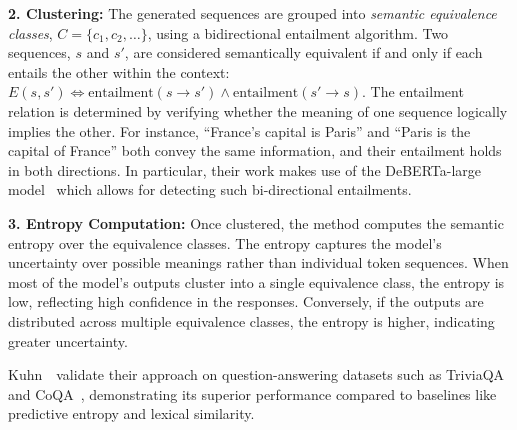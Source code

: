     \noindent\textbf{2. Clustering:} The generated sequences are grouped into \emph{semantic equivalence classes}, $C = \{c_1, c_2, \ldots\}$, using a bidirectional entailment algorithm. 
            Two sequences, $s$ and $s'$, are considered semantically equivalent if and only if each entails the other within the context:
    $E(s, s') \iff \text{entailment}(s \rightarrow s') \land \text{entailment}(s' \rightarrow s)$.
    The entailment relation is determined by verifying whether the meaning of one sequence logically implies the other. 
    For instance, “France's capital is Paris” and “Paris is the capital of France” both convey the same information, and their entailment holds in both directions. 
    In particular, their work makes use of the DeBERTa-large model~\cite{he2020deberta} which allows for detecting such bi-directional entailments.  

    
    \noindent\textbf{3. Entropy Computation:} Once clustered, the method computes the semantic entropy over the equivalence classes. 
    The entropy captures the model's uncertainty over possible meanings rather than individual token sequences. 
    When most of the model's outputs cluster into a single equivalence class, the entropy is low, reflecting high confidence in the responses. 
    Conversely, if the outputs are distributed across multiple equivalence classes, the entropy is higher, indicating greater uncertainty.

Kuhn~\etal~validate their approach on question-answering datasets such as TriviaQA~\cite{triviaqa} and CoQA~\cite{coqa}, demonstrating its superior performance compared to baselines like predictive entropy and lexical similarity. 

